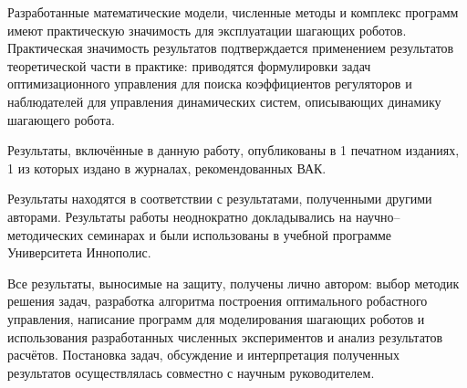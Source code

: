 Разработанные математические модели, численные методы и комплекс программ имеют практическую значимость для эксплуатации шагающих роботов. Практическая значимость результатов подтверждается применением результатов теоретической части в практике: приводятся формулировки задач оптимизационного управления для поиска коэффициентов регуляторов и наблюдателей для управления динамических систем, описывающих динамику шагающего робота. 

{\reliability} 

Результаты, включённые в данную работу, опубликованы в 1 печатном изданиях, 1 из которых издано в журналах, рекомендованных ВАК.

Результаты находятся в соответствии с результатами, полученными другими авторами. Результаты работы неоднократно докладывались на научно--методических семинарах и были использованы в учебной программе Университета Иннополис.

{\contribution} 

Все результаты, выносимые на защиту, получены лично автором: выбор методик решения задач, разработка алгоритма построения оптимального робастного управления, написание программ для моделирования шагающих роботов и использования разработанных численных экспериментов и анализ результатов расчётов. Постановка задач, обсуждение и интерпретация полученных результатов осуществлялась совместно с научным руководителем.